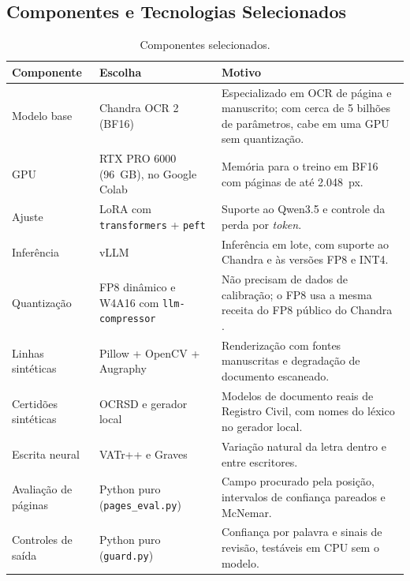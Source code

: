 \documentclass[12pt,a4paper]{article}
\begin{document}
\subsection{Componentes e Tecnologias Selecionados}

\begin{table}[H]
\centering
\small
\begin{tabular}{@{}p{3.4cm}p{5.2cm}p{6.0cm}@{}}
\toprule
Componente & Escolha & Motivo \\
\midrule
Modelo base & Chandra OCR 2 (BF16) \cite{chandra2026} & Especializado em OCR de página e manuscrito; com cerca de 5 bilhões de parâmetros, cabe em uma GPU sem quantização. \\
GPU & RTX PRO 6000 (96~GB), no Google Colab & Memória para o treino em BF16 com páginas de até 2.048~px. \\
Ajuste & LoRA com \texttt{transformers} + \texttt{peft} \cite{peft2022} & Suporte ao Qwen3.5 e controle da perda por \emph{token}. \\
Inferência & vLLM \cite{vllm2023} & Inferência em lote, com suporte ao Chandra e às versões FP8 e INT4. \\
Quantização & FP8 dinâmico e W4A16 com \texttt{llm-compressor} \cite{llmcompressor} & Não precisam de dados de calibração; o FP8 usa a mesma receita do FP8 público do Chandra \cite{chandrafp8}. \\
Linhas sintéticas & Pillow + OpenCV + Augraphy \cite{augraphy2022} & Renderização com fontes manuscritas e degradação de documento escaneado. \\
Certidões sintéticas & OCRSD \cite{ocrsd} e gerador local & Modelos de documento reais de Registro Civil, com nomes do léxico no gerador local. \\
Escrita neural & VATr++ \cite{vatrpp2024} e Graves \cite{graves2013} & Variação natural da letra dentro e entre escritores. \\
Avaliação de páginas & Python puro (\texttt{pages\_eval.py}) & Campo procurado pela posição, intervalos de confiança pareados e McNemar. \\
Controles de saída & Python puro (\texttt{guard.py}) & Confiança por palavra e sinais de revisão, testáveis em CPU sem o modelo. \\
\bottomrule
\end{tabular}
\caption{Componentes selecionados.}
\end{table}

\end{document}
